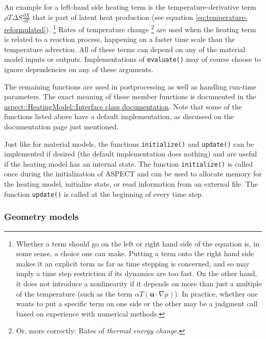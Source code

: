 \documentclass{article}
\newcommand{\aspect}{\textsc{ASPECT}}
\begin{document}
An example for a left-hand side heating term is the temperature-derivative term 
$\rho T \Delta S \frac{\partial X}{\partial T}$ that is part of latent heat production 
(see equation \eqref{eq:temperature-reformulated}).%
\footnote{Whether a term should go on the left or right hand side of
  the equation is, in some sense, a choice one can make. Putting a
  term onto the right hand side makes it an explicit term as far as
  time stepping is concerned, and so may imply a time step restriction
  if its dynamics are too fast. On the other hand, it does not
  introduce a nonlinearity if it depends on more than just a multiple
  of the temperature (such as the term $\alpha T \left( \mathbf u
  \cdot \nabla p \right)$). In practice, whether one wants to put a
  specific term on one side or the other may be a judgment call based
  on experience with numerical methods.}
Rates of temperature change%
\footnote{Or, more correctly: Rates of \textit{thermal energy change}.}
are used when the heating term is related to a reaction process, happening 
on a faster time scale than the temperature advection. 
All of these terms can depend on any of the material model inputs or outputs. 
Implementations of \texttt{evaluate()} may of course choose to ignore dependencies on any
of these arguments.

The remaining functions are used in postprocessing as well as
handling run-time parameters. The exact meaning of these member functions is
documented in the
\href{doc/doxygen/classaspect_1_1HeatingModel_1_1Interface.html}{aspect::HeatingModel::Interface
class documentation}. Note that some of the functions listed above have a
default implementation, as discussed on the documentation page just
mentioned.

Just like for material models, the functions \texttt{initialize()} and \texttt{update()} can be 
implemented if desired (the default implementation does
nothing) and are useful if the heating model has an internal state. The function \texttt{initialize()} is called once during
the initialization of \aspect{} and can be used to allocate memory for
the heating model, initialize state, or read information from
an external file. The function \texttt{update()} is called at the beginning of every time step.


\subsubsection{Geometry models}
\label{sec:geometry-models}
\end{document}
